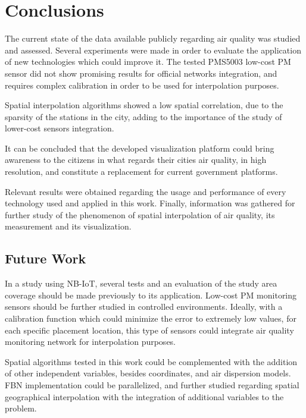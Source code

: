 \section{Conclusions}
\label{sec:concl}

The current state of the data available publicly regarding air quality was studied and assessed. Several experiments were made in order to evaluate the application of new technologies which could improve it. The tested PMS5003 low-cost PM sensor did not show promising results for official networks integration, and requires complex calibration in order to be used for interpolation purposes. 

Spatial interpolation algorithms showed a low spatial correlation, due to the sparsity of the stations in the city, adding to the importance of the study of lower-cost sensors integration. 

It can be concluded that the developed visualization platform could bring awareness to the citizens in what regards their cities air quality, in high resolution, and constitute a replacement for current government platforms.

Relevant results were obtained regarding the usage and performance of every technology used and applied in this work. Finally, information was gathered for further study of the phenomenon of spatial interpolation of air quality, its measurement and its visualization.

\subsection{Future Work}

In a study using NB-IoT, several tests and an evaluation of the study area coverage should be made previously to its application. Low-cost PM monitoring sensors should be further studied in controlled environments. Ideally, with a  calibration function which could minimize the error to extremely low values, for each specific placement location, this type of sensors could integrate air quality monitoring network for interpolation purposes.

Spatial algorithms tested in this work could be complemented with the addition of other independent variables, besides coordinates, and air dispersion models. FBN implementation could be parallelized, and further studied regarding spatial geographical interpolation with the integration of additional variables to the problem.
